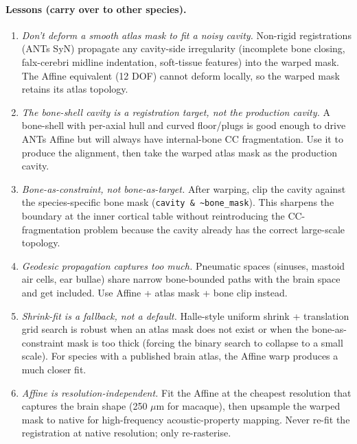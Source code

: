 \documentclass{compactarticle}
\begin{document}
\paragraph{Lessons (carry over to other species).}
\begin{enumerate}[leftmargin=*]
\setlength\itemsep{0pt}
  \item \emph{Don't deform a smooth atlas mask to fit a noisy cavity.}
        Non-rigid registrations (ANTs SyN) propagate any cavity-side
        irregularity (incomplete bone closing, falx-cerebri midline
        indentation, soft-tissue features) into the warped mask. The
        Affine equivalent (12 DOF) cannot deform locally, so the
        warped mask retains its atlas topology.
  \item \emph{The bone-shell cavity is a registration target, not the
        production cavity.} A bone-shell with per-axial hull and
        curved floor/plugs is good enough to drive ANTs Affine but
        will always have internal-bone CC fragmentation. Use it to
        produce the alignment, then take the warped atlas mask as the
        production cavity.
  \item \emph{Bone-as-constraint, not bone-as-target.} After warping,
        clip the cavity against the species-specific bone mask
        (\texttt{cavity \& \textasciitilde bone\_mask}). This sharpens
        the boundary at the inner cortical table without reintroducing
        the CC-fragmentation problem because the cavity already has
        the correct large-scale topology.
  \item \emph{Geodesic propagation captures too much.} Pneumatic
        spaces (sinuses, mastoid air cells, ear bullae) share narrow
        bone-bounded paths with the brain space and get included.
        Use Affine + atlas mask + bone clip instead.
  \item \emph{Shrink-fit is a fallback, not a default.} Halle-style
        uniform shrink + translation grid search is robust when an
        atlas mask does not exist or when the bone-as-constraint mask
        is too thick (forcing the binary search to collapse to a
        small scale). For species with a published brain atlas, the
        Affine warp produces a much closer fit.
  \item \emph{Affine is resolution-independent.} Fit the Affine at
        the cheapest resolution that captures the brain shape (250
        $\mu$m for macaque), then upsample the warped mask to native
        for high-frequency acoustic-property mapping. Never re-fit
        the registration at native resolution; only re-rasterise.
\end{enumerate}
\end{document}

